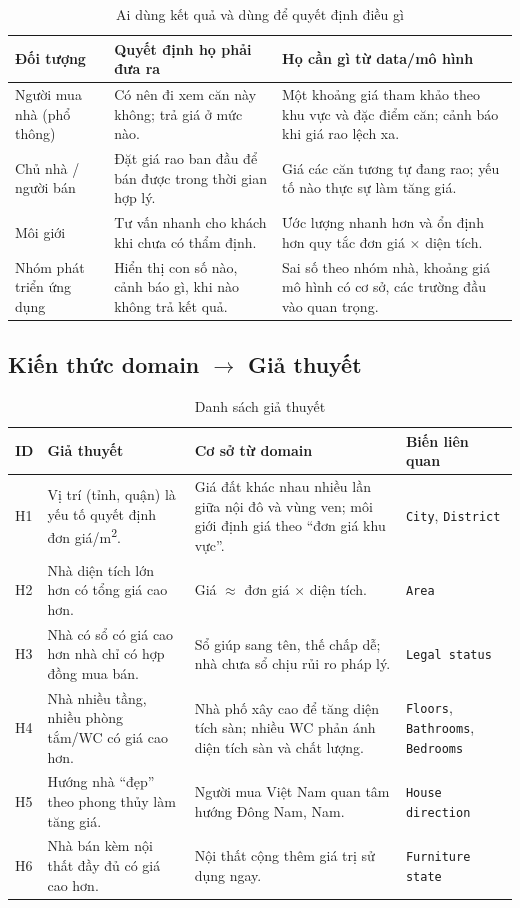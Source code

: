 \documentclass[11pt]{article}
\begin{document}
\begin{table}[H]
\centering
\small
\caption{Ai dùng kết quả và dùng để quyết định điều gì}
\begin{tabular}{@{}L{0.20\textwidth}L{0.34\textwidth}L{0.38\textwidth}@{}}
\toprule
\textbf{Đối tượng} & \textbf{Quyết định họ phải đưa ra} & \textbf{Họ cần gì từ data/mô hình} \\
\midrule
Người mua nhà (phổ thông) & Có nên đi xem căn này không; trả giá ở mức nào. & Một khoảng giá tham khảo theo khu vực và đặc điểm căn; cảnh báo khi giá rao lệch xa. \\
Chủ nhà / người bán & Đặt giá rao ban đầu để bán được trong thời gian hợp lý. & Giá các căn tương tự đang rao; yếu tố nào thực sự làm tăng giá. \\
Môi giới & Tư vấn nhanh cho khách khi chưa có thẩm định. & Ước lượng nhanh hơn và ổn định hơn quy tắc đơn giá $\times$ diện tích. \\
Nhóm phát triển ứng dụng & Hiển thị con số nào, cảnh báo gì, khi nào không trả kết quả. & Sai số theo nhóm nhà, khoảng giá mô hình có cơ sở, các trường đầu vào quan trọng. \\
\bottomrule
\end{tabular}
\end{table}

\subsection{Kiến thức domain \texorpdfstring{$\rightarrow$}{→} Giả thuyết}

\begin{table}[H]
\centering
\small
\caption{Danh sách giả thuyết}
\begin{tabular}{@{}L{0.05\textwidth}L{0.30\textwidth}L{0.33\textwidth}L{0.22\textwidth}@{}}
\toprule
\textbf{ID} & \textbf{Giả thuyết} & \textbf{Cơ sở từ domain} & \textbf{Biến liên quan} \\
\midrule
H1 & Vị trí (tỉnh, quận) là yếu tố quyết định đơn giá/m\textsuperscript{2}. & Giá đất khác nhau nhiều lần giữa nội đô và vùng ven; môi giới định giá theo ``đơn giá khu vực''. & \texttt{City}, \texttt{District} \\
H2 & Nhà diện tích lớn hơn có tổng giá cao hơn. & Giá $\approx$ đơn giá $\times$ diện tích. & \texttt{Area} \\
H3 & Nhà có sổ có giá cao hơn nhà chỉ có hợp đồng mua bán. & Sổ giúp sang tên, thế chấp dễ; nhà chưa sổ chịu rủi ro pháp lý. & \texttt{Legal status} \\
H4 & Nhà nhiều tầng, nhiều phòng tắm/WC có giá cao hơn. & Nhà phố xây cao để tăng diện tích sàn; nhiều WC phản ánh diện tích sàn và chất lượng. & \texttt{Floors}, \texttt{Bathrooms}, \texttt{Bedrooms} \\
H5 & Hướng nhà ``đẹp'' theo phong thủy làm tăng giá. & Người mua Việt Nam quan tâm hướng Đông Nam, Nam. & \texttt{House direction} \\
H6 & Nhà bán kèm nội thất đầy đủ có giá cao hơn. & Nội thất cộng thêm giá trị sử dụng ngay. & \texttt{Furniture state} \\
\bottomrule
\end{tabular}
\end{table}
\end{document}

